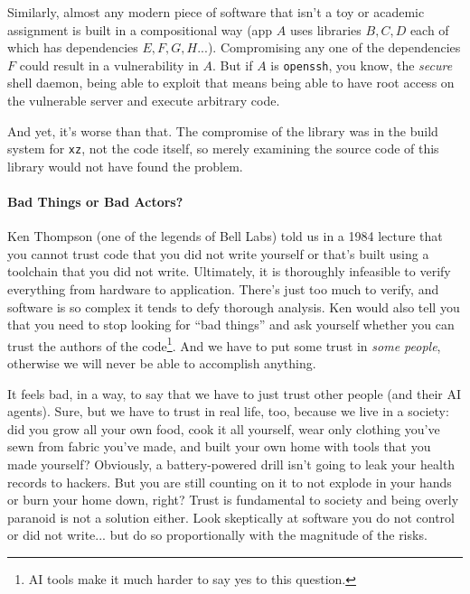 Similarly, almost any modern piece of software that isn't a toy or academic assignment is built in a compositional way (app $A$ uses libraries $B, C, D$ each of which has dependencies $E, F, G, H...$). Compromising any one of the dependencies $F$ could result in a vulnerability in $A$. But if $A$ is \texttt{openssh}, you know, the \textit{secure} shell daemon, being able to exploit that means being able to have root access on the vulnerable server and execute arbitrary code. 

And yet, it's worse than that. The compromise of the library was in the build system for \texttt{xz}, not the code itself, so merely examining the source code of this library would not have found the problem.

\paragraph{Bad Things or Bad Actors?} Ken Thompson (one of the legends of Bell Labs) told us in a 1984 lecture that you cannot trust code that you did not write yourself or that's built using a toolchain that you did not write. Ultimately, it is thoroughly infeasible to verify everything from hardware to application. There's just too much to verify, and software is so complex it tends to defy thorough analysis. Ken would also tell you that you need to stop looking for ``bad things'' and ask yourself whether you can trust the authors of the code\footnote{AI tools make it much harder to say yes to this question.}. And we have to put some trust in \textit{some people}, otherwise we will never be able to accomplish anything. 

It feels bad, in a way, to say that we have to just trust other people (and their AI agents). Sure, but we have to trust in real life, too, because we live in a society: did you grow all your own food, cook it all yourself, wear only clothing you've sewn from fabric you've made, and built your own home with tools that you made yourself? Obviously, a battery-powered drill isn't going to leak your health records to hackers. But you are still counting on it to not explode in your hands or burn your home down, right? Trust is fundamental to society and being overly paranoid is not a solution either. Look skeptically at software you do not control or did not write... but do so proportionally with the magnitude of the risks.





